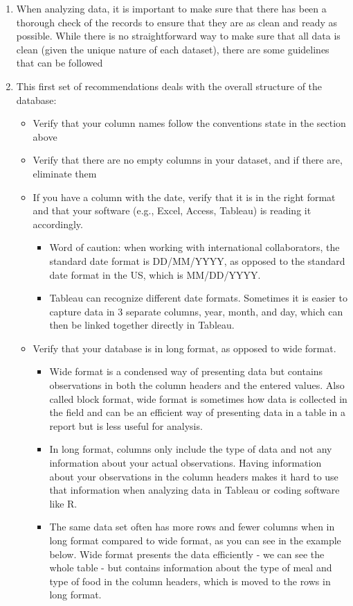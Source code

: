 \documentclass[
]{book}
\begin{document}
\begin{enumerate}
\def\labelenumi{\arabic{enumi}.}
\item
  When analyzing data, it is important to make sure that there has been a thorough check of the records to ensure that they are as clean and ready as possible. While there is no straightforward way to make sure that all data is clean (given the unique nature of each dataset), there are some guidelines that can be followed
\item
  This first set of recommendations deals with the overall structure of the database:

  \begin{itemize}
  \item
    Verify that your column names follow the conventions state in the section above
  \item
    Verify that there are no empty columns in your dataset, and if there are, eliminate them
  \item
    If you have a column with the date, verify that it is in the right format and that your
    software (e.g., Excel, Access, Tableau) is reading it accordingly.

    \begin{itemize}
    \item
      Word of caution: when working with international collaborators, the standard date format is DD/MM/YYYY, as opposed to the standard date format in the US, which is MM/DD/YYYY.
    \item
      Tableau can recognize different date formats. Sometimes it is easier to capture data in 3 separate columns, year, month, and day, which can then be linked together directly in Tableau.
    \end{itemize}
  \item
    Verify that your database is in long format, as opposed to wide format.

    \begin{itemize}
    \item
      Wide format is a condensed way of presenting data but contains observations in both the column headers and the entered values. Also called block format, wide format is sometimes how data is collected in the field and can be an efficient way of presenting data in a table in a report but is less useful for analysis.
    \item
      In long format, columns only include the type of data and not any information about your actual observations. Having information about your observations in the column headers makes it hard to use that information when analyzing data in Tableau or coding software like R.
    \item
      The same data set often has more rows and fewer columns when in long format compared to wide format, as you can see in the example below. Wide format presents the data efficiently - we can see the whole table - but contains information about the type of meal and type of food in the column headers, which is moved to the rows in long format.
    \end{itemize}
  \end{itemize}
\end{enumerate}
\end{document}
